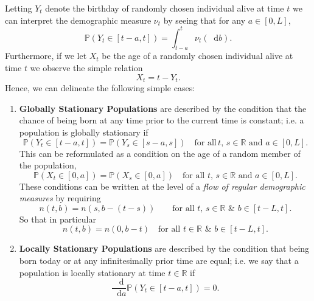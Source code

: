 \documentclass[11pt,oneside,english,reqno,dvipsnames,table]{amsart}
\numberwithin{equation}{section}
\theoremstyle{plain}
\theoremstyle{definition}
\theoremstyle{remark}
\theoremstyle{plain}
\theoremstyle{plain}
\theoremstyle{plain}
\theoremstyle{plain}
\theoremstyle{plain}
\theoremstyle{plain}
\theoremstyle{plain}
\newcommand{\dd}{\mathop{}\!\mathrm{d}}
\newcommand{\mbP}{\mathbb{P}}
\newcommand{\mbR}{\mathbb{R}}
\numberwithin{thm}{section}
\begin{document}
Letting $Y_t$ denote the birthday of randomly chosen individual alive at time $t$ we can interpret the demographic measure $\nu_t$ by seeing that for any $a\in [0,L]$,
%
\begin{equation*}
    \mbP(Y_t \in [t-a,t]) = \int_{t-a}^t  \nu_t(\dd b).
\end{equation*}
%
Furthermore, if we let $X_t$ be the age of a randomly chosen individual alive at time $t$ we observe the simple relation
%
\begin{equation*}
    X_t = t-Y_t.
\end{equation*}
%
Hence, we can delineate the following simple cases:
%
\begin{enumerate}
    \item \label{it:glob_stat}\textbf{Globally Stationary Populations} are described by the condition that the chance of being born at any time prior to the current time is constant; i.e. a population is globally stationary if
 \begin{equation*}
        \mbP(Y_t \in [t-a,t]) = \mbP(Y_s \in [s-a,s]) \quad \text{for all}\,t,\, s \in \mbR\,\,\text{and}\,\,  a\in [0,L].
    \end{equation*}
 This can be reformulated as a condition on the age of a random member of the population,
    \begin{equation*}
        \mbP(X_t \in [0,a]) = \mbP(X_s \in [0,a]) \quad \text{for all}\,\, t,\,s \in \mbR\,\,\text{and}\,\,  a\in [0,L].
    \end{equation*}
    These conditions can be written at the level of a \emph{flow of regular demographic measures} by requiring %
    \begin{equation}\label{eq:reg_stat_pop}
        n(t,b) = n(s,b-(t-s))\quad \quad \text{for all}\,\, t,\,s \in \mbR\,\,\&\,\,  b\in [t-L,t].
    \end{equation}
    So that in particular
    \begin{equation*}
    	n(t,b) = n(0,b-t)\quad \text{for all}\,\, t\in \mbR\,\,\&\,\, b\in [t-L,t].
    \end{equation*}
\item \label{it:loc_stat}\textbf{Locally Stationary Populations} are described by the condition that being born today or at any infinitesimally prior time are equal; i.e. we say that a population is locally stationary at time $t\in \mbR$ if
%
\begin{equation*}
    \frac{\dd}{\dd a} \mbP(Y_t \in [t-a,t])=0.
\end{equation*}

\end{enumerate}
\end{document}
